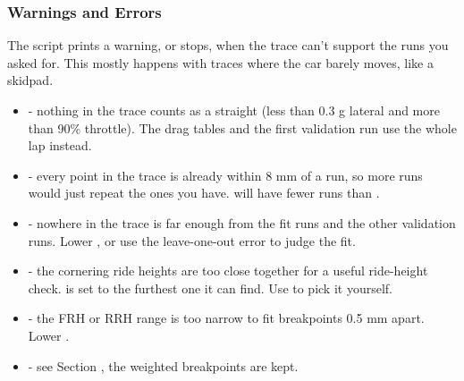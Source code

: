 \subsubsection{Warnings and Errors}
The script prints a warning, or stops, when the trace can't support the runs you asked for. This mostly happens with traces where the car barely moves, like a skidpad.
\begin{itemize}
    \item {} - nothing in the trace counts as a straight (less than 0.3 g lateral and more than 90\% throttle). The drag tables and the first validation run use the whole lap instead.

    \item {} - every point in the trace is already within 8 mm of a run, so more runs would just repeat the ones you have.  will have fewer runs than .

    \item {} - nowhere in the trace is far enough from the fit runs and the other validation runs. Lower , or use the leave-one-out error to judge the fit.

    \item {} - the cornering ride heights are too close together for a useful ride-height check.  is set to the furthest one it can find. Use  to pick it yourself.

    \item {} - the FRH or RRH range is too narrow to fit  breakpoints 0.5 mm apart. Lower .

    \item {} - see Section , the weighted breakpoints are kept.
\end{itemize}
